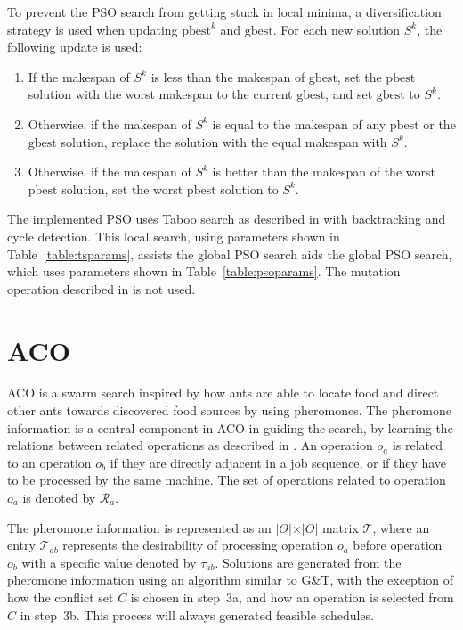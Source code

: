 \documentclass[paper=a4, fontsize=9pt]{scrartcl}
\begin{document}
\begin{multicols}{2}
To prevent the \ac{PSO} search from getting stuck in local minima, a diversification strategy is used when updating $\text{pbest}^k$ and $\text{gbest}$. For each new solution $S^k$, the following update is used:

\begin{enumerate}
    \item If the makespan of $S^k$ is less than the makespan of $\text{gbest}$, set the $\text{pbest}$ solution with the worst makespan to the current $\text{gbest}$, and set $\text{gbest}$ to $S^k$.
    \item Otherwise, if the makespan of $S^k$ is equal to the makespan of any $\text{pbest}$ or the $\text{gbest}$ solution, replace the solution with the equal makespan with $S^k$.
    \item Otherwise, if the makespan of $S^k$ is better than the makespan of the worst $\text{pbest}$ solution, set the worst $\text{pbest}$ solution to $S^k$.
\end{enumerate}

The implemented \ac{PSO} uses Taboo search as described in \cite{nowicki1996fast} with backtracking and cycle detection. This local search, using parameters shown in Table~\ref{table:tsparams}, assists the global \ac{PSO} search aids the global \ac{PSO} search, which uses parameters shown in Table~\ref{table:psoparams}. The mutation operation described in \cite{sha2006hybrid} is not used.

\section*{\acl{ACO}}

\acf{ACO} is a swarm search inspired by how ants are able to locate food and direct other ants towards discovered food sources by using pheromones. The pheromone information is a central component in \ac{ACO} in guiding the search, by learning the relations between related operations as described in \cite{blum2004ant}. An operation $o_a$ is related to an operation $o_b$ if they are directly adjacent in a job sequence, or if they have to be processed by the same machine. The set of operations related to operation $o_a$ is denoted by $\mathcal{R}_a$.

The pheromone information is represented as an $\vert O \vert \times \vert O \vert$ matrix $\mathcal{T}$, where an entry $\mathcal{T}_{ab}$ represents the desirability of processing operation $o_a$ before operation $o_b$ with a specific value denoted by $\tau_{ab}$. Solutions are generated from the pheromone information using an algorithm similar to G\&T, with the exception of how the conflict set $C$ is chosen in step~3a, and how an operation is selected from $C$ in step~3b. This process will always generated feasible schedules.


\end{multicols}
\end{document}
